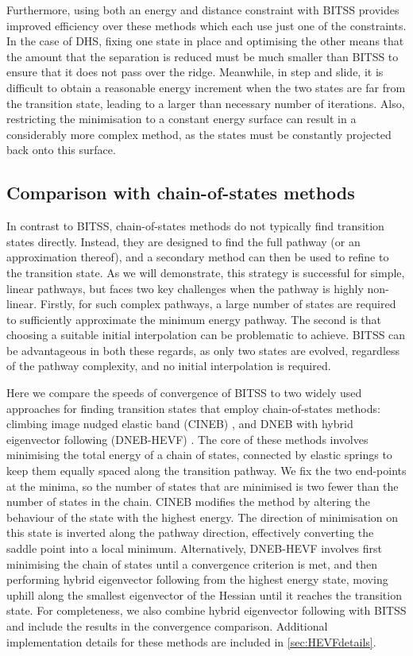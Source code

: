 \documentclass[aip,jcp,reprint,twocolumn]{revtex4-1}
\begin{document}
Furthermore, using both an energy and distance constraint with BITSS provides improved efficiency over these methods which each use just one of the constraints.
In the case of DHS, fixing one state in place and optimising the other means that the amount that the separation is reduced must be much smaller than BITSS to ensure that it does not pass over the ridge.
Meanwhile, in step and slide, it is difficult to obtain a reasonable energy increment when the two states are far from the transition state, leading to a larger than necessary number of iterations.
Also, restricting the minimisation to a constant energy surface can result in a considerably more complex method, as the states must be constantly projected back onto this surface.


\subsection{Comparison with chain-of-states methods}
In contrast to BITSS, chain-of-states methods do not typically find transition states directly.
Instead, they are designed to find the full pathway (or an approximation thereof), and a secondary method can then be used to refine to the transition state.
As we will demonstrate, this strategy is successful for simple, linear pathways, but faces two key challenges when the pathway is highly non-linear.
Firstly, for such complex pathways, a large number of states are required to sufficiently approximate the minimum energy pathway.
The second is that choosing a suitable initial interpolation can be problematic to achieve.
BITSS can be advantageous in both these regards, as only two states are evolved, regardless of the pathway complexity, and no initial interpolation is required.

Here we compare the speeds of convergence of BITSS to two widely used approaches for finding transition states that employ chain-of-states methods: climbing image nudged elastic band (CINEB) \cite{Henkelman2000a}, and DNEB with hybrid eigenvector following (DNEB-HEVF) \cite{Cerjan1981}.
The core of these methods involves minimising the total energy of a chain of states, connected by elastic springs to keep them equally spaced along the transition pathway.
We fix the two end-points at the minima, so the number of states that are minimised is two fewer than the number of states in the chain.
CINEB modifies the method by altering the behaviour of the state with the highest energy.
The direction of minimisation on this state is inverted along the pathway direction, effectively converting the saddle point into a local minimum.
Alternatively, DNEB-HEVF involves first minimising the chain of states until a convergence criterion is met, and then performing hybrid eigenvector following from the highest energy state, moving uphill along the smallest eigenvector of the Hessian until it reaches the transition state.
For completeness, we also combine hybrid eigenvector following with BITSS and include the results in the convergence comparison.
Additional implementation details for these methods are included in \cref{sec:HEVFdetails}.
\end{document}
